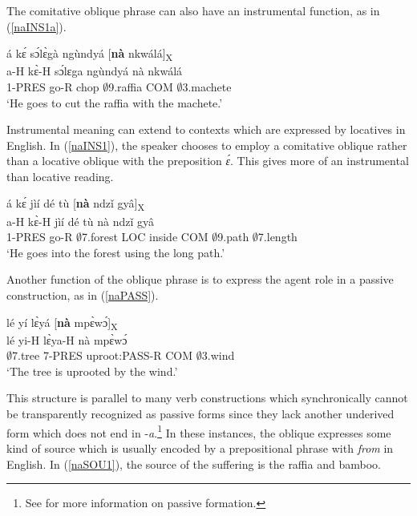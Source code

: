 \noindent The comitative oblique phrase can also have an instrumental function, as in (\ref{naINS1a}).

\begin{exe} 
\ex\label{naINS1a}
  \glll  á kɛ́ sɔ́lɛ̀gà ngùndyá [{\bfseries nà} nkwálá]\textsubscript{X}  \\
          a-H kɛ̀-H sɔ́lɛga ngùndyá nà nkwálá   \\
      1-PRES go-R chop $\emptyset$9.raffia COM $\emptyset$3.machete \\
    \trans `He goes to cut the raffia with the machete.'
\end{exe}

Instrumental meaning can extend to contexts which are expressed by locatives in English. In (\ref{naINS1}), the speaker chooses to employ a comitative oblique rather than a locative oblique with the preposition {\itshape ɛ́}. This gives more of an instrumental than locative reading.

\begin{exe} 
\ex\label{naINS1}
  \glll  á kɛ́ jìí dé tù [{\bfseries nà} ndzǐ gyâ]\textsubscript{X}  \\
          a-H kɛ̀-H jìí dé tù nà ndzǐ gyâ      \\
      1-PRES go-R $\emptyset$7.forest LOC inside COM $\emptyset$9.path $\emptyset$7.length \\
    \trans `He goes into the forest using the long path.'
\end{exe}

\noindent Another function of the oblique phrase is to express the agent role in a passive construction, as in (\ref{naPASS}).

\begin{exe} 
\ex\label{naPASS}
  \glll lé yí lɛ̀yá [{\bfseries nà} mpɛ̀wɔ́]\textsubscript{X}  \\
        lé yi-H lɛ̀ya-H nà mpɛ̀wɔ́ \\
        $\emptyset$7.tree 7-PRES uproot:PASS-R COM $\emptyset$3.wind   \\
    \trans `The tree is uprooted by the wind.'
\end{exe}

\noindent This structure is parallel to many verb constructions which synchronically cannot be transparently recognized as passive forms since they lack another underived form which does not end in -{\itshape a}.\footnote{See  for more information on passive formation.}
In these instances, the oblique expresses some kind of source which is usually encoded by a prepositional phrase with {\itshape from} in English. In (\ref{naSOU1}), the source of the suffering is the raffia and bamboo.

